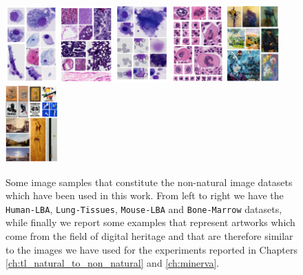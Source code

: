 

\begin{figure}
  \centering
   \includegraphics[width=2cm,height=\textheight,keepaspectratio]{./Images/Chapter06/lba.pdf}%
  \includegraphics[width=2cm,height=\textheight,keepaspectratio]{./Images/Chapter06/tissus.pdf}%
  \includegraphics[width=2cm,height=\textheight,keepaspectratio]{./Images/Chapter06/mouse_lba.pdf}%
    \includegraphics[width=2cm,height=\textheight,keepaspectratio]{./Images/Chapter06/bonemarrow.pdf}%
  \includegraphics[width=2cm,height=\textheight,keepaspectratio]{./Images/Chapter06/artist.pdf}%
  \includegraphics[width=2cm,height=\textheight,keepaspectratio]{./Images/Chapter06/type.pdf}%
  \caption{Some image samples that constitute the non-natural image datasets which have been used in this work. From left to right we have the \texttt{Human-LBA}, \texttt{Lung-Tissues}, \texttt{Mouse-LBA} and \texttt{Bone-Marrow} datasets, while finally we report some examples that represent artworks which come from the field of digital heritage and that are therefore similar to the images we have used for the experiments reported in Chapters \ref{ch:tl_natural_to_non_natural} and \ref{ch:minerva}.}
\label{fig:dataset_images}
\end{figure}

